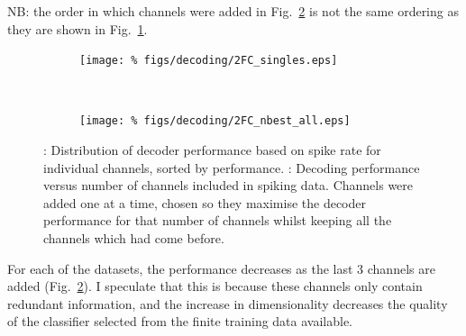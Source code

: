 NB: the order in which channels were added in Fig.~\ref{fig:dec_nbest} is not the same ordering as they are shown in Fig.~\ref{fig:dec_singles}.

\begin{figure}[htbp]
    \begin{subfigure}[b]{0.5\linewidth}
        \centering
        \caption{}
        \label{fig:dec_singles}
        \texttt{[image: \%
figs/decoding/2FC\_singles.eps]}
    \end{subfigure}
    ~~
    \begin{subfigure}[b]{0.5\linewidth}
        \centering
        \caption{}
        \label{fig:dec_nbest}
        \texttt{[image: \%
figs/decoding/2FC\_nbest\_all.eps]}
    \end{subfigure}
    \caption{
\protect{}: Distribution of decoder performance based on spike rate for individual channels, sorted by performance.
\protect{}: Decoding performance versus number of channels included in spiking data.
Channels were added one at a time, chosen so they maximise the decoder performance for that number of channels whilst keeping all the channels which had come before.
}
    \label{fig:dec_n}
\end{figure}

For each of the datasets, the performance decreases as the last 3 channels are added (Fig.~\ref{fig:dec_nbest}).
I speculate that this is because these channels only contain redundant information, and the increase in dimensionality decreases the quality of the classifier selected from the finite training data available.


